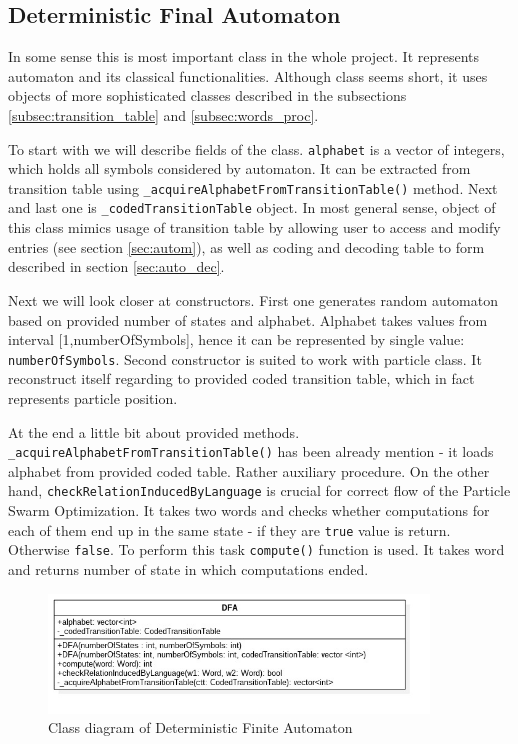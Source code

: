 \documentclass{article}
\begin{document}

%
%
\newpage
\subsection{Deterministic Final Automaton}
In some sense this is most important class in the whole project. It represents automaton and its classical functionalities. Although class seems short, it uses objects of more sophisticated classes described in the subsections \ref{subsec:transition_table} and \ref{subsec:words_proc}. 

To start with we will describe fields of the class. \texttt{alphabet} is a vector of integers, which holds all symbols considered by automaton. It can be extracted from transition table using \texttt{\_acquireAlphabetFromTransitionTable()} method. Next and last one is \texttt{\_codedTransitionTable} object. In most general sense, object of this class mimics usage of transition table by allowing user to access and modify entries (see section \ref{sec:autom}), as well as coding and decoding table to form described in section \ref{sec:auto_dec}. 

Next we will look closer at constructors. First one generates random automaton based on provided number of states and alphabet. Alphabet takes values from interval [1,numberOfSymbols], hence it can be represented by single value: \texttt{numberOfSymbols}. Second constructor is suited to work with particle class. It reconstruct itself regarding to provided coded transition table, which in fact represents particle position. 

At the end a little bit about provided methods. \texttt{\_acquireAlphabetFromTransitionTable()} has been already mention - it loads alphabet from provided coded table. Rather auxiliary procedure. On the other hand, \texttt{checkRelationInducedByLanguage} is crucial for correct flow of the Particle Swarm Optimization. It takes two words and checks whether computations for each of them end up in the same state - if they are \texttt{true} value is return. Otherwise \texttt{false}. To perform this task \texttt{compute()} function is used. It takes word and returns number of state in which computations ended.

\begin{figure}[H]
	\centering
	\includegraphics[width=0.9\textwidth]{images/dfa.jpg}
    \caption{Class diagram of Deterministic Finite Automaton}
    \label{fig:dfa_class}
\end{figure}
\end{document}
